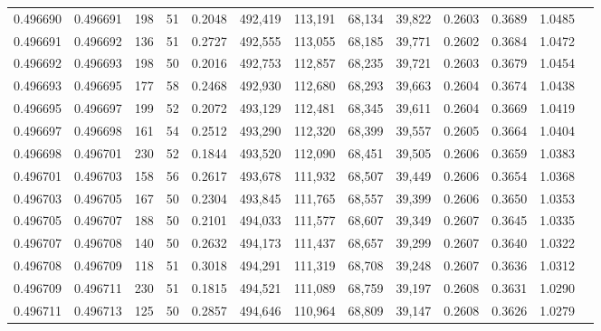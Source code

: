 \begin{tabular}{rrrrrrrrrrrrr}
0.496690 & 0.496691 &   198 &  51 &                                     0.2048 & 492,419 & 113,191 &  68,134 &  39,822 & 0.2603 & 0.3689 & 1.0485 \\
0.496691 & 0.496692 &   136 &  51 &                                     0.2727 & 492,555 & 113,055 &  68,185 &  39,771 & 0.2602 & 0.3684 & 1.0472 \\
0.496692 & 0.496693 &   198 &  50 &                                     0.2016 & 492,753 & 112,857 &  68,235 &  39,721 & 0.2603 & 0.3679 & 1.0454 \\
0.496693 & 0.496695 &   177 &  58 &                                     0.2468 & 492,930 & 112,680 &  68,293 &  39,663 & 0.2604 & 0.3674 & 1.0438 \\
0.496695 & 0.496697 &   199 &  52 &                                     0.2072 & 493,129 & 112,481 &  68,345 &  39,611 & 0.2604 & 0.3669 & 1.0419 \\
0.496697 & 0.496698 &   161 &  54 &                                     0.2512 & 493,290 & 112,320 &  68,399 &  39,557 & 0.2605 & 0.3664 & 1.0404 \\
0.496698 & 0.496701 &   230 &  52 &                                     0.1844 & 493,520 & 112,090 &  68,451 &  39,505 & 0.2606 & 0.3659 & 1.0383 \\
0.496701 & 0.496703 &   158 &  56 &                                     0.2617 & 493,678 & 111,932 &  68,507 &  39,449 & 0.2606 & 0.3654 & 1.0368 \\
0.496703 & 0.496705 &   167 &  50 &                                     0.2304 & 493,845 & 111,765 &  68,557 &  39,399 & 0.2606 & 0.3650 & 1.0353 \\
0.496705 & 0.496707 &   188 &  50 &                                     0.2101 & 494,033 & 111,577 &  68,607 &  39,349 & 0.2607 & 0.3645 & 1.0335 \\
0.496707 & 0.496708 &   140 &  50 &                                     0.2632 & 494,173 & 111,437 &  68,657 &  39,299 & 0.2607 & 0.3640 & 1.0322 \\
0.496708 & 0.496709 &   118 &  51 &                                     0.3018 & 494,291 & 111,319 &  68,708 &  39,248 & 0.2607 & 0.3636 & 1.0312 \\
0.496709 & 0.496711 &   230 &  51 &                                     0.1815 & 494,521 & 111,089 &  68,759 &  39,197 & 0.2608 & 0.3631 & 1.0290 \\
0.496711 & 0.496713 &   125 &  50 &                                     0.2857 & 494,646 & 110,964 &  68,809 &  39,147 & 0.2608 & 0.3626 & 1.0279 \\

\end{tabular}
